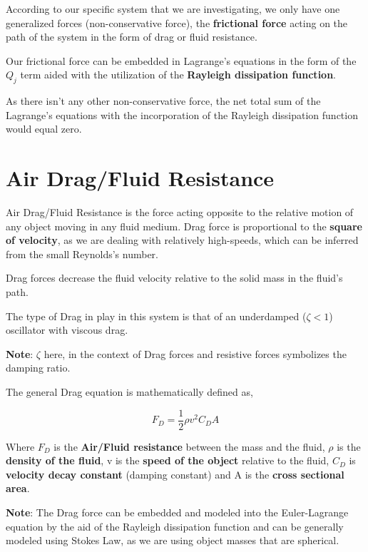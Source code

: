     {According to our specific system that we are investigating, we only have one generalized forces (non-conservative force), the \textbf{frictional force} acting on the path of the system in the form of drag or fluid resistance.}
        
    {Our frictional force can be embedded in Lagrange's equations in the form of the $Q_j$ term aided with the utilization of the \textbf{Rayleigh dissipation function}.}
        
    {As there isn't any other non-conservative force, the net total sum of the Lagrange's equations with the incorporation of the Rayleigh dissipation function would equal zero.}
        
\section{{Air Drag/Fluid Resistance}}
        
    {Air Drag/Fluid Resistance is the force acting opposite to the relative motion of any object moving in any fluid medium. Drag force is proportional to the \textbf{square of velocity}, as we are dealing with relatively high-speeds, which can be inferred from the small Reynolds's number.}
            
    {Drag forces decrease the fluid velocity relative to the solid mass in the fluid's path.}
            
    {The type of Drag in play in this system is that of an underdamped ($\zeta < 1$) oscillator with viscous drag.}
            
    {\textbf{Note}: $\zeta$ here, in the context of Drag forces and resistive forces symbolizes the damping ratio.}
            
    {The general Drag equation is mathematically defined as,}
            
        $$F_D = \frac{1}{2}\rho v^2C_DA$$
           
    {Where $F_D$ is the \textbf{Air/Fluid resistance} between the mass and the fluid, $\rho$ is the \textbf{density of the fluid}, v is the \textbf{speed of the object} relative to the fluid, $C_D$ is \textbf{velocity decay constant} (damping constant) and A is the \textbf{cross sectional area}.}
            
    {\textbf{Note}: The Drag force can be embedded and modeled into the Euler-Lagrange equation by the aid of the Rayleigh dissipation function and can be generally modeled using Stokes Law, as we are using object masses that are spherical.}
            
